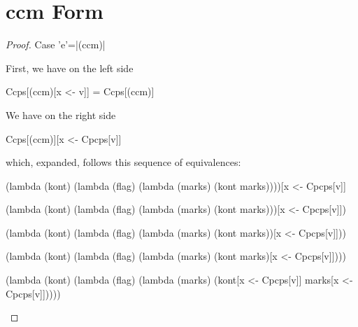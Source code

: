 \section{ccm Form}
\begin{proof}{Case \scheme'e'=\scheme|(ccm)|}

First, we have on the left side
\begin{schemeblock}
\begin{schemedisplay}
Ccps[(ccm)[x <- v]] = Ccps[(ccm)]
\end{schemedisplay}
\end{schemeblock}

We have on the right side
\begin{schemeblock}
\begin{schemedisplay}
Ccps[(ccm)][x <- Cpcps[v]]
\end{schemedisplay}
\end{schemeblock}
which, expanded, follows this sequence of equivalences:

\begin{schemeblock}
\begin{schemedisplay}
(lambda (kont)
  (lambda (flag)
    (lambda (marks)
      (kont marks))))[x <- Cpcps[v]]
\end{schemedisplay}
\end{schemeblock}

\begin{schemeblock}
\begin{schemedisplay}
(lambda (kont)
  (lambda (flag)
    (lambda (marks)
      (kont marks)))[x <- Cpcps[v]])
\end{schemedisplay}
\end{schemeblock}

\begin{schemeblock}
\begin{schemedisplay}
(lambda (kont)
  (lambda (flag)
    (lambda (marks)
      (kont marks))[x <- Cpcps[v]]))
\end{schemedisplay}
\end{schemeblock}

\begin{schemeblock}
\begin{schemedisplay}
(lambda (kont)
  (lambda (flag)
    (lambda (marks)
      (kont marks)[x <- Cpcps[v]])))
\end{schemedisplay}
\end{schemeblock}

\begin{schemeblock}
\begin{schemedisplay}
(lambda (kont)
  (lambda (flag)
    (lambda (marks)
      (kont[x <- Cpcps[v]] marks[x <- Cpcps[v]]))))
\end{schemedisplay}
\end{schemeblock}


\end{proof}
